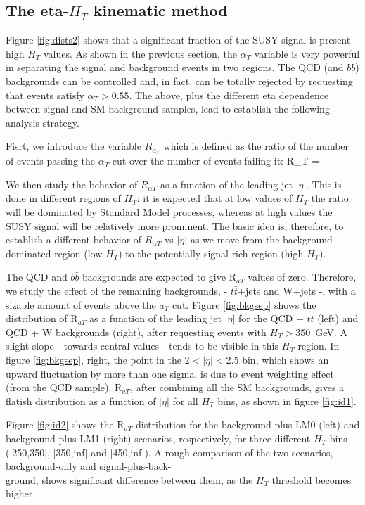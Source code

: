 \subsection{The eta-$H_{T}$ kinematic method}

Figure \ref{fig:dists2} shows that a significant fraction of the SUSY signal is present high $H_{T}$ values.  As shown in the previous section, the $\alpha_T$ variable is very powerful in separating the signal and background events in two regions.  The QCD (and $b\bar{b}$) backgrounds can be controlled and, in fact, can be totally rejected by requesting that events satisfy $\alpha_{T}>0.55$. The above, plus the different eta dependence between signal and SM background samples, lead to establish the following analysis strategy.

Fisrt, we introduce the variable $R_{\alpha_T}$ which is defined as the ratio of the number of events passing the $\alpha_T$ cut over the number of events failing it:
\bea
R_{\alpha T} = 
\eea

We then study the behavior of $R_{\alpha T}$ as a function of the leading jet $|\eta|$.  This is done in different regions of $H_T$: it is expected that at low values of $H_T$ the ratio will be dominated by Standard Model processes, whereas at high values the SUSY signal will be relatively more prominent.  The basic idea is, therefore, to establish a different behavior of $R_{\alpha T}$ vs $|\eta|$ as we move from the background-dominated region (low-$H_T$) to the potentially signal-rich region (high $H_T$).

The QCD and $b\bar{b}$ backgrounds are expected to give R$_{aT}$ values of zero. Therefore, we study the effect of the remaining backgrounds, - $t\bar{t}$+jets and W+jets -, with a sizable amount of events above the $a_{T}$ cut. Figure \ref{fig:bkgsep} shows the distribution of R$_{aT}$ as a function of the leading jet $|\eta|$ for the QCD + $t\bar{t}$ (left) and QCD + W backgrounds (right), after requesting events with $H_T>$350~GeV. A slight slope - towards central values - tends to be visible in this $H_{T}$ region. In figure \ref{fig:bkgsep}, right, the point in the  $2< |\eta| < 2.5$ bin, which shows an upward fluctuation by more than one sigma, is due to event weighting effect (from the QCD sample). R$_{aT}$, after combining all the SM backgrounds, gives a flatish distribution as a function of $|\eta|$ for all $H_{T}$ bins, as shown in figure \ref{fig:id1}. 
       
Figure \ref{fig:id2} shows the R$_{aT}$ distribution for the background-plus-LM0 (left) and background-plus-LM1 (right) scenarios, respectively, for three different $H_{T}$ bins ([250,350], [350,inf] and [450,inf]). A rough comparison of the two scenarios, background-only and signal-plus-back- \\ ground, shows significant difference between them, as the $H_{T}$ threshold becomes higher.  

